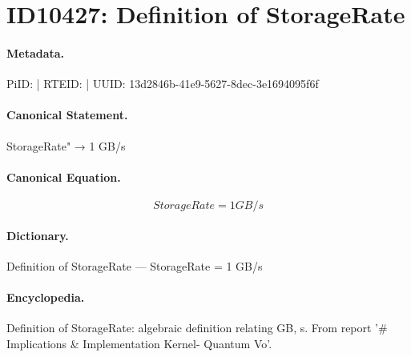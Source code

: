 \section*{ID10427: Definition of StorageRate}
\paragraph{Metadata.}
PiID:  | RTEID:  | UUID: 13d2846b-41e9-5627-8dec-3e1694095f6f

\paragraph{Canonical Statement.}
StorageRate" → 1 GB/s

\paragraph{Canonical Equation.}
\[
StorageRate = 1 GB/s
\]

\paragraph{Dictionary.}
Definition of StorageRate — StorageRate = 1 GB/s

\paragraph{Encyclopedia.}
Definition of StorageRate: algebraic definition relating GB, s. From report '\# Implications \& Implementation Kernel- Quantum Vo'.
